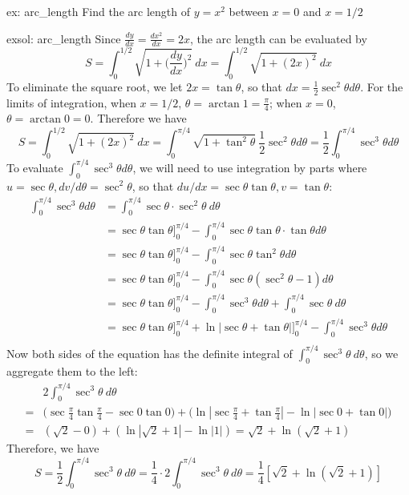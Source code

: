 \begin{ex}[]{ex: arc_length}
    Find the arc length of $y = x^2$ between $x = 0$ and $x = 1/2$
\end{ex}

\begin{exsol}[]{exsol: arc_length}
    Since $\frac{dy}{dx} = \frac{dx^2}{dx} = 2x$, the arc length can be evaluated by
    \[S = \int_0^{1/2} \sqrt{1+\Big(\frac{dy}{dx}\Big)^2}~dx = \int_0^{1/2} \sqrt{1+(2x)^2}~dx\]
    To eliminate the square root, we let $2x = \tan \theta$, so that $dx = \frac{1}{2}\sec^2 \theta d \theta$.  For the limits of integration, when $x = 1/2$, $\theta = \arctan 1 = \frac{\pi}{4}$; when $x = 0$, $\theta = \arctan 0 = 0$.  Therefore we have
    \[S = \int_0^{1/2} \sqrt{1+(2x)^2}~dx = \int_0^{\pi/4} \sqrt{1+\tan^2\theta}~\frac{1}{2}\sec^2\theta d\theta= \frac{1}{2} \int_0^{\pi/4} \sec^3\theta d\theta\]
    To evaluate $\int_0^{\pi/4} \sec^3\theta d\theta$, we will need to use integration by parts where $u = \sec \theta, dv/d\theta = \sec^2 \theta$, so that $du/dx = \sec\theta \tan\theta, v = \tan \theta$:
    \begin{align*}
        \int_0^{\pi/4} \sec^3\theta d\theta &= \int_0^{\pi/4} \sec \theta \cdot \sec^2 \theta~d\theta\\
        &= \sec \theta \tan \theta\big]_0^{\pi/4} - \int_0^{\pi/4} \sec\theta \tan\theta \cdot \tan\theta d\theta\\
        &= \sec \theta \tan \theta\big]_0^{\pi/4} - \int_0^{\pi/4} \sec\theta \tan^2\theta d\theta\\
        &= \sec \theta \tan \theta\big]_0^{\pi/4} - \int_0^{\pi/4} \sec\theta (\sec^2\theta -1) d\theta\\
        &= \sec \theta \tan \theta\big]_0^{\pi/4} - \int_0^{\pi/4} \sec^3\theta d\theta + \int_0^{\pi/4} \sec\theta~d\theta\\
        &= \sec \theta \tan \theta\big]_0^{\pi/4} + \ln|\sec\theta + \tan\theta|\big]_0^{\pi/4} - \int_0^{\pi/4} \sec^3\theta d\theta\\
    \end{align*}
    Now both sides of the equation has the definite integral of $\int_0^{\pi/4}\sec^3\theta~d\theta$, so we aggregate them to the left:
    \begin{align*}
        &2\int_0^{\pi/4}\sec^3\theta~d\theta\\
        = &\Big(\sec\frac{\pi}{4}\tan\frac{\pi}{4}-\sec 0 \tan 0\Big) + \Big(\ln|\sec\frac{\pi}{4}+\tan\frac{\pi}{4}|-\ln|\sec 0 + \tan 0|\Big)\\
        = & (\sqrt{2} -0)+ (\ln|\sqrt{2}+1|-\ln|1|) = \sqrt{2}+\ln(\sqrt{2}+1)
    \end{align*}
    Therefore, we have
    \[ S= \frac{1}{2}\int_0^{\pi/4}\sec^3\theta~d\theta = \frac{1}{4} \cdot 2\int_0^{\pi/4}\sec^3\theta~d\theta = \frac{1}{4}[\sqrt{2}+\ln(\sqrt{2}+1)]\]
\end{exsol}

